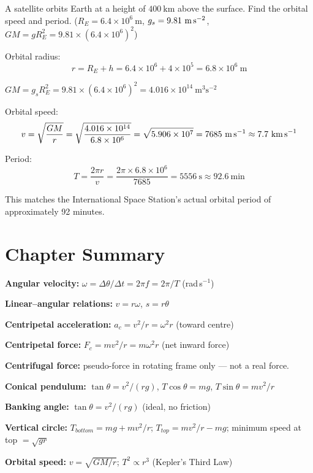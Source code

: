 \begin{examplebox}[6.5]
A satellite orbits Earth at a height of
$400\ \text{km}$ above the surface. Find the orbital
speed and period. ($R_E = 6.4 \times 10^6\ \text{m}$,
$g_s = 9.81\ \text{m\,s}^{-2}$,
$GM = gR_E^2 = 9.81 \times (6.4\times10^6)^2$)
\end{examplebox}

\begin{solutionbox}
Orbital radius:
\[
  r = R_E + h = 6.4\times10^6 + 4\times10^5
  = 6.8\times10^6\ \text{m}
\]

$GM = g_s R_E^2 = 9.81 \times (6.4\times10^6)^2
= 4.016\times10^{14}\ \text{m}^3\text{s}^{-2}$

Orbital speed:
\[
  v = \sqrt{\frac{GM}{r}}
  = \sqrt{\frac{4.016\times10^{14}}{6.8\times10^6}}
  = \sqrt{5.906\times10^7}
  = 7685\ \text{m\,s}^{-1}
  \approx 7.7\ \text{km\,s}^{-1}
\]

Period:
\[
  T = \frac{2\pi r}{v}
  = \frac{2\pi \times 6.8\times10^6}{7685}
  = 5556\ \text{s}
  \approx 92.6\ \text{min}
\]

This matches the International Space Station's
actual orbital period of approximately 92 minutes.
\end{solutionbox}

\section{Chapter Summary}

\begin{summarybox}
\textbf{Angular velocity:}
$\omega = \Delta\theta/\Delta t = 2\pi f = 2\pi/T$
(rad\,s$^{-1}$)

\textbf{Linear--angular relations:}
$v = r\omega$, $s = r\theta$

\textbf{Centripetal acceleration:}
$a_c = v^2/r = \omega^2 r$ (toward centre)

\textbf{Centripetal force:}
$F_c = mv^2/r = m\omega^2 r$ (net inward force)

\textbf{Centrifugal force:} pseudo-force in rotating
frame only --- not a real force.

\textbf{Conical pendulum:}
$\tan\theta = v^2/(rg)$,
$T\cos\theta = mg$, $T\sin\theta = mv^2/r$

\textbf{Banking angle:}
$\tan\theta = v^2/(rg)$ (ideal, no friction)

\textbf{Vertical circle:}
$T_{bottom} = mg + mv^2/r$;
$T_{top} = mv^2/r - mg$;
minimum speed at top $= \sqrt{gr}$

\textbf{Orbital speed:}
$v = \sqrt{GM/r}$;
$T^2 \propto r^3$ (Kepler's Third Law)
\end{summarybox}

